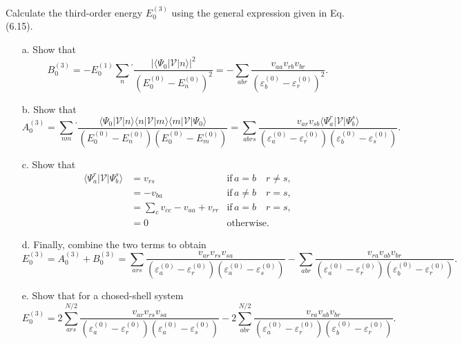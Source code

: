 \documentclass[a4paper]{book}
\begin{document}
	\begin{exercise}
	Calculate the third-order energy $E^{(3)}_0$ using the general expression given in Eq.(6.15).
	\begin{enumerate}
	
	\item[a.] Show that
	\[
		B^{(3)}_0 = - E^{(1)}_0 \sum_n {}^\prime \frac{|\langle \Psi_0 | \mathscr{V} | n \rangle |^2}{(E^{(0)}_0-E^{(0)}_n)^2} = - \sum_{abr} \frac{v_{aa} v_{rb} v_{br}}{( \varepsilon^{(0)}_b - \varepsilon^{(0)}_r)^2}.
	\]
		
	\item[b.] Show that
	\[
		A^{(3)}_0 = \sum_{nm} {}^\prime \frac{\langle \Psi_0 | \mathscr{V} | n \rangle \langle n | \mathscr{V} | m \rangle \langle m | \mathscr{V} | \Psi_0 \rangle}{(E^{(0)}_0-E^{(0)}_n)(E^{(0)}_0-E^{(0)}_m)} = \sum_{abrs} \frac{v_{ar} v_{sb} \langle \Psi^r_a | \mathscr{V} | \Psi^s_b \rangle}{( \varepsilon^{(0)}_a - \varepsilon^{(0)}_r)( \varepsilon^{(0)}_b - \varepsilon^{(0)}_s)}.
	\]
	
	\item[c.] Show that
	\begin{align*}
		\langle \Psi^r_a | \mathscr{V} | \Psi^s_b \rangle &= v_{rs} & \text{if} \, a = b  \quad r \neq s, \\
		&= - v_{ba} & \text{if} \, a \neq b \quad r = s, \\
		&= \sum_{c} v_{cc} - v_{aa} + v_{rr} & \text{if} \, a = b \quad r = s , \\
		&= 0 & \text{otherwise}.
	\end{align*}
		
	\item[d.] Finally, combine the two terms to obtain
	\[
		E^{(3)}_0 = A^{(3)}_0 + B^{(3)}_0 = \sum_{ars} \frac{v_{ar} v_{rs} v_{sa}}{( \varepsilon^{(0)}_a - \varepsilon^{(0)}_r)( \varepsilon^{(0)}_a - \varepsilon^{(0)}_s)} - \sum_{abr} \frac{v_{ra} v_{ab} v_{br}}{( \varepsilon^{(0)}_a - \varepsilon^{(0)}_r) ( \varepsilon^{(0)}_b - \varepsilon^{(0)}_r)}.
	\]
	
	\item[e.] Show that for a chosed-shell system
	\[
		E^{(3)}_0 = 2\sum_{ars}^{N/2} \frac{v_{ar} v_{rs} v_{sa}}{( \varepsilon^{(0)}_a - \varepsilon^{(0)}_r)( \varepsilon^{(0)}_a - \varepsilon^{(0)}_s)} - 2\sum_{abr}^{N/2} \frac{v_{ra} v_{ab} v_{br}}{( \varepsilon^{(0)}_a - \varepsilon^{(0)}_r) ( \varepsilon^{(0)}_b - \varepsilon^{(0)}_r)}.
	\]
	
	\end{enumerate}
	\end{exercise}
	
\end{document}
